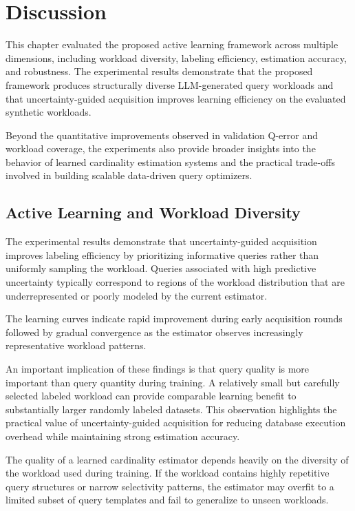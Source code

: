 \section{Discussion}

This chapter evaluated the proposed active learning framework across multiple dimensions, including workload diversity, labeling efficiency, estimation accuracy, and robustness. The experimental results demonstrate that the proposed framework produces structurally diverse LLM-generated query workloads and that uncertainty-guided acquisition improves learning efficiency on the evaluated synthetic workloads.

Beyond the quantitative improvements observed in validation Q-error and workload coverage, the experiments also provide broader insights into the behavior of learned cardinality estimation systems and the practical trade-offs involved in building scalable data-driven query optimizers. 

\subsection{Active Learning and Workload Diversity}

The experimental results demonstrate that uncertainty-guided acquisition improves labeling efficiency by prioritizing informative queries rather than uniformly sampling the workload. Queries associated with high predictive uncertainty typically correspond to regions of the workload distribution that are underrepresented or poorly modeled by the current estimator.

The learning curves indicate rapid improvement during early acquisition rounds followed by gradual convergence as the estimator observes increasingly representative workload patterns.

An important implication of these findings is that query quality is more important than query quantity during training. A relatively small but carefully selected labeled workload can provide comparable learning benefit to substantially larger randomly labeled datasets. This observation highlights the practical value of uncertainty-guided acquisition for reducing database execution overhead while maintaining strong estimation accuracy.

The quality of a learned cardinality estimator depends heavily on the diversity of the workload used during training. If the workload contains highly repetitive query structures or narrow selectivity patterns, the estimator may overfit to a limited subset of query templates and fail to generalize to unseen workloads.

